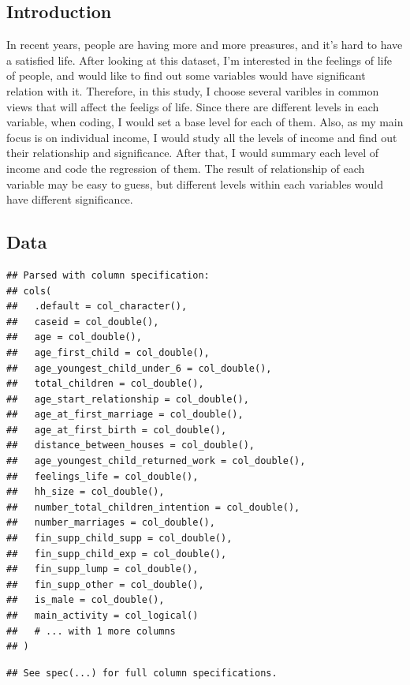 \documentclass[]{article}
\begin{document}
\hypertarget{introduction}{%
\subsection{Introduction}\label{introduction}}

In recent years, people are having more and more preasures, and it's
hard to have a satisfied life. After looking at this dataset, I'm
interested in the feelings of life of people, and would like to find out
some variables would have significant relation with it. Therefore, in
this study, I choose several varibles in common views that will affect
the feeligs of life. Since there are different levels in each variable,
when coding, I would set a base level for each of them. Also, as my main
focus is on individual income, I would study all the levels of income
and find out their relationship and significance. After that, I would
summary each level of income and code the regression of them. The result
of relationship of each variable may be easy to guess, but different
levels within each variables would have different significance.

\hypertarget{data}{%
\subsection{Data}\label{data}}

\begin{verbatim}
## Parsed with column specification:
## cols(
##   .default = col_character(),
##   caseid = col_double(),
##   age = col_double(),
##   age_first_child = col_double(),
##   age_youngest_child_under_6 = col_double(),
##   total_children = col_double(),
##   age_start_relationship = col_double(),
##   age_at_first_marriage = col_double(),
##   age_at_first_birth = col_double(),
##   distance_between_houses = col_double(),
##   age_youngest_child_returned_work = col_double(),
##   feelings_life = col_double(),
##   hh_size = col_double(),
##   number_total_children_intention = col_double(),
##   number_marriages = col_double(),
##   fin_supp_child_supp = col_double(),
##   fin_supp_child_exp = col_double(),
##   fin_supp_lump = col_double(),
##   fin_supp_other = col_double(),
##   is_male = col_double(),
##   main_activity = col_logical()
##   # ... with 1 more columns
## )
\end{verbatim}

\begin{verbatim}
## See spec(...) for full column specifications.
\end{verbatim}
\end{document}
